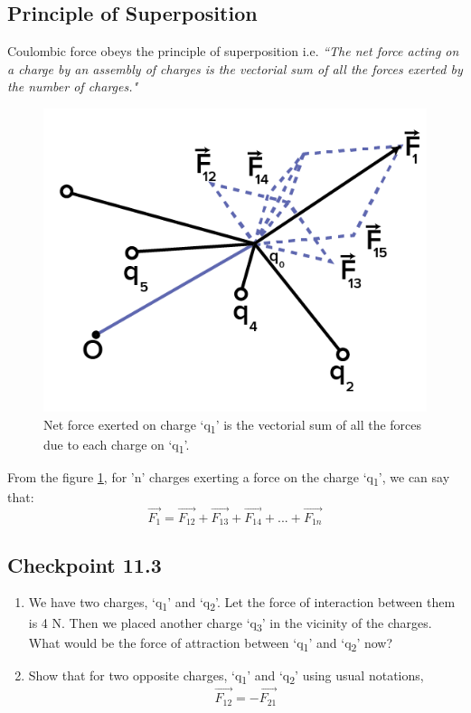 \subsection{Principle of Superposition}
Coulombic force obeys the principle of superposition i.e. \textit{``The net force acting on a charge
by an assembly of charges is the vectorial
sum of all the forces exerted by the number of charges."}
\begin{figure}[H]
  \centering
  \includegraphics[scale = 1.2]{Images/11.2.png}
  \caption{Net force exerted  on charge `q\textsubscript{1}' is 
  the vectorial sum of all the forces due to each charge on `q\textsubscript{1}'.}
  \label{fig:11.2}
\end{figure}
From the figure \ref{fig:11.2}, for 'n' charges exerting a
force on the charge `q\textsubscript{1}', we can say that:
\begin{equation}  
  \vec{F_{1}} = \vec{F_{12}} + \vec{F_{13}} + \vec{F_{14}}+...+\vec{F_{1n}} \nonumber
\end{equation}
\subsection*{Checkpoint 11.3}
\begin{enumerate}[label=(\alph*)]
  \item We have two charges, `q\textsubscript{1}' and `q\textsubscript{2}'.
  Let the force of interaction between them is 4 N. Then we placed another charge `q\textsubscript{3}' in the vicinity of the charges.
  What would be the force of attraction between `q\textsubscript{1}' and `q\textsubscript{2}' now?
  \item Show that for two opposite charges, `q\textsubscript{1}' and `q\textsubscript{2}' using usual notations,
  \begin{equation}
    \vec{F_{12}} = -\vec{F_{21}} \nonumber
  \end{equation}
\end{enumerate}
